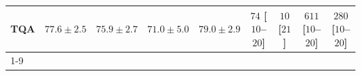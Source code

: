 \begin{tabular}{l|cccc|cccc|}
TQA & {\cellcolor[HTML]{0D75B3}} \color[HTML]{F1F1F1} $77.6\pm 2.5$ & {\cellcolor[HTML]{3790C0}} \color[HTML]{F1F1F1} $75.9\pm 2.7$ & {\cellcolor[HTML]{B8C6E0}} \color[HTML]{000000} $71.0\pm 5.0$ & {\cellcolor[HTML]{04649E}} \color[HTML]{F1F1F1} $79.0\pm 2.9$ & {\cellcolor[HTML]{FEE9E5}} \color[HTML]{000000} $74$ [$10$--$20$] & {\cellcolor[HTML]{FFF7F3}} \color[HTML]{000000} $10$ [$21$] & {\cellcolor[HTML]{B30681}} \color[HTML]{F1F1F1} $611$ [$10$--$20$] & {\cellcolor[HTML]{FBACB9}} \color[HTML]{000000} $280$ [$10$--$20$] \\
\cline{1-9}
\bottomrule
\end{tabular}
